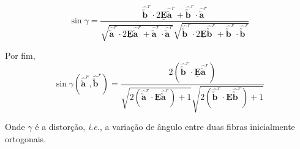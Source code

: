 \[\sin\gamma=\frac{\hat{\utilde{\mathbf{b}}}^r\cdot2\underline{\mathbf{E}}\hat{\utilde{\mathbf{a}}}^r+\hat{\utilde{\mathbf{b}}}^r\cdot\hat{\utilde{\mathbf{a}}}^r}{\displaystyle\sqrt{\hat{\utilde{\mathbf{a}}}^r\cdot2\underline{\mathbf{E}}\hat{\utilde{\mathbf{a}}}^r+\hat{\utilde{\mathbf{a}}}^r\cdot\hat{\utilde{\mathbf{a}}}^r}\sqrt{\hat{\utilde{\mathbf{b}}}^r\cdot2\underline{\mathbf{E}}\hat{\utilde{\mathbf{b}}}^r+\hat{\utilde{\mathbf{b}}}^r\cdot\hat{\utilde{\mathbf{b}}}^r}}\]

Por fim,
\begin{equation}\label{eq-distorcao-fibra-2}
    \sin\gamma(\hat{\utilde{\mathbf{a}}}^r,\hat{\utilde{\mathbf{b}}}^r)=\frac{2(\hat{\utilde{\mathbf{b}}}^r\cdot\underline{\mathbf{E}}\hat{\utilde{\mathbf{a}}}^r)}{\displaystyle\sqrt{2(\hat{\utilde{\mathbf{a}}}^r\cdot\underline{\mathbf{E}}\hat{\utilde{\mathbf{a}}}^r)+1}\sqrt{2(\hat{\utilde{\mathbf{b}}}^r\cdot\underline{\mathbf{E}}\hat{\utilde{\mathbf{b}}}^r)+1}}
\end{equation}

Onde $\gamma$ é a distorção, \textit{i.e.}, a variação de ângulo entre duas fibras inicialmente ortogonais.